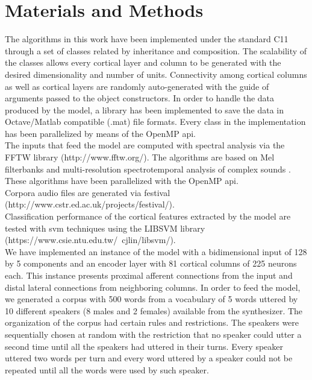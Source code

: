 \documentclass[11pt,a4paper]{article}
\newcommand{\CC}{C\nolinebreak\hspace{-.05em}\raisebox{.4ex}{\tiny\bf +}\nolinebreak\hspace{-.10em}\raisebox{.4ex}{\tiny\bf +}}
\begin{document}
\section{Materials and Methods}

The algorithms in this work have been implemented under the standard \CC11 through a set of
classes related by inheritance and composition.
The scalability of the classes allows every cortical layer and column to be generated
with the desired dimensionality and number of units. Connectivity among cortical columns as well as
cortical layers are randomly auto-generated with the guide of arguments passed to the
object constructors. In order to handle the data produced by the model,
a library has been implemented to save the data in Octave/Matlab compatible (.mat) file formats.
Every class in the implementation has been parallelized by means of the OpenMP \gls{api}. \\

The inputs that feed the model are computed
with spectral analysis via the FFTW library (http://www.fftw.org/).
The algorithms are based on 
Mel filterbanks and multi-resolution
spectrotemporal analysis of complex sounds \cite{taishih_2005}.
These algorithms have been parallelized with the OpenMP \gls{api}. \\

Corpora audio files are generated via \gls{festival} \\ (http://www.cstr.ed.ac.uk/projects/festival/). \\

Classification performance of the cortical features extracted by the model are tested with
\gls{svm} techniques using the LIBSVM library (https://www.csie.ntu.edu.tw/~cjlin/libsvm/). \\

We have implemented an instance of the model with a bidimensional input
of 128 by 5 components and an encoder layer
with 81 cortical columns of 225 neurons each.
This instance presents proximal afferent connections
from the input and distal lateral connections from
neighboring columns.
In order to feed the model, we generated a corpus with 500 words from a vocabulary of
5 words uttered by 10 different speakers (8 males and 2 females) available from the synthesizer.
The organization of the corpus had certain rules and restrictions.
The speakers were sequentially chosen at random with the restriction that no speaker could
utter a second time until all the speakers had uttered in their turns.
Every speaker uttered two words per turn and every word uttered by a speaker
could not be repeated until all the words were used by such speaker. \\
\end{document}
